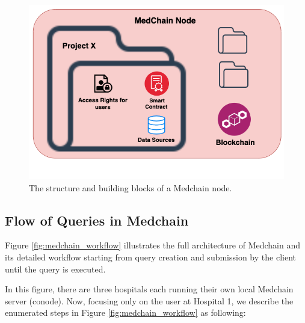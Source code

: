 \begin{figure}[ht] 
        \centering \includegraphics[width=0.7\columnwidth]{Images/medchain_node.png}
        \caption{\label{fig:medchain_node} 
         The structure and building blocks of a Medchain node.
        }
\end{figure}

\subsection{Flow of Queries in Medchain}\label{arch:flow}
Figure \ref{fig:medchain_workflow} illustrates the full architecture of Medchain and its detailed workflow starting from query creation and submission by the client until the query is executed. 

In this figure, there are three hospitals each running their own local Medchain server (conode). Now, focusing only on the user at Hospital 1, we describe the enumerated steps in Figure \ref{fig:medchain_workflow} as following:

